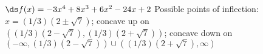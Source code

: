 {$\ds f(x) = -3 x^4+8 x^3+6 x^2-24 x+2$
}
{Possible points of inflection: $x=(1/3)(2\pm\sqrt{7})$;
concave up on $((1/3)(2-\sqrt{7}),(1/3)(2+\sqrt{7}))$;
concave down on $(-\infty,(1/3)(2-\sqrt{7}))\cup((1/3)(2+\sqrt{7}),\infty)$
}
